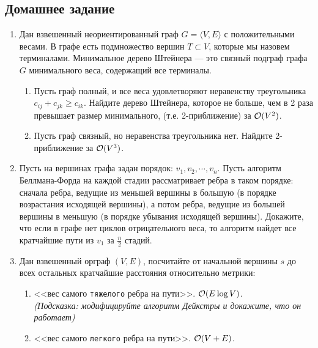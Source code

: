 \subsection{Домашнее задание}
\begin{enumerate}
  \item
    Дан взвешенный неориентированный граф $G = \langle V, E \rangle$ с положительными весами.
    В графе есть подмножество вершин $T \subset V$, которые мы назовем терминалами.
    Минимальное дерево Штейнера --- это связный подграф графа $G$ минимального веса, содержащий
    все терминалы.
    \begin{enumerate}
      \item
        Пусть граф полный, и все веса удовлетворяют неравенству треугольника $c_{ij} + c_{jk} \geq c_{ik}$.
        Найдите дерево Штейнера, которое не больше, чем в 2 раза превышает размер минимального,
        (т.е. 2-приближение) за $\mathcal{O}(V^2)$.
      \item
        Пусть граф связный, но неравенства треугольника нет. Найдите 2-приближение за $\mathcal{O}(V^3)$.
    \end{enumerate}

  \item
    Пусть на вершинах графа задан порядок: $v_1, v_2, \cdots, v_n$.
    Пусть алгоритм Беллмана-Форда на каждой стадии рассматривает
    ребра в таком порядке: сначала ребра, ведущие из меньшей вершины в
    большую (в порядке возрастания исходящей вершины), а потом ребра,
    ведущие из большей вершины в меньшую (в порядке убывания исходящей
    вершины). Докажите, что если в графе нет циклов отрицательного
    веса, то алгоритм найдет все кратчайшие пути из $v_1$ за $\frac{n}{2}$
    стадий.

  \item
    Дан взвешенный орграф $(V, E)$, посчитайте от начальной вершины $s$ до всех остальных
    кратчайшие расстояния относительно метрики:
    \begin{enumerate}
      \item <<вес самого \texttt{тяжелого} ребра на пути>>. $\mathcal{O}(E \log{V})$. \\
        \textit{(Подсказка: модифицируйте алгоритм Дейкстры и докажите, что он работает)}
      \item <<вес самого \texttt{легкого} ребра на пути>>. $\mathcal{O}(V + E)$.
    \end{enumerate}



\end{enumerate}

